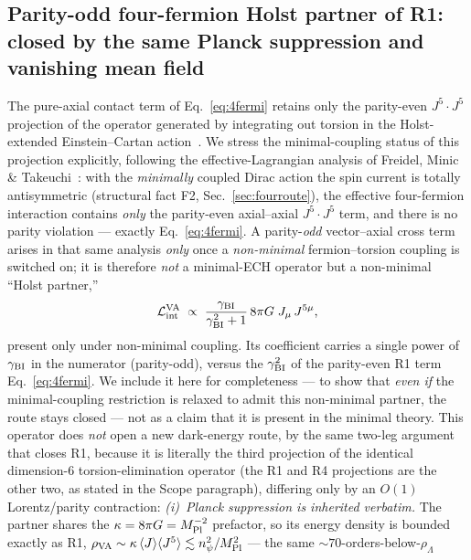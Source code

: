 \documentclass[aps,prd,twocolumn,superscriptaddress,showpacs,preprintnumbers,nofootinbib,longbibliography,floatfix]{revtex4-2}
\begin{document}
\subsection{Parity-odd four-fermion Holst partner of R1: closed by the same
Planck suppression and vanishing mean field}
\label{sec:r1_parityodd_partner}
The pure-axial contact term of Eq.~\eqref{eq:4fermi} retains only the
parity-even $J^5\!\cdot\!J^5$ projection of the operator generated by
integrating out torsion in the Holst-extended Einstein--Cartan
action~\cite{Freidel2005,Mercuri2009}. We stress the minimal-coupling
status of this projection explicitly, following the effective-Lagrangian
analysis of Freidel, Minic \& Takeuchi~\cite{Freidel2005}: with the
\emph{minimally} coupled Dirac action the spin current is totally
antisymmetric (structural fact F2, Sec.~\ref{sec:fourroute}), the effective
four-fermion interaction contains \emph{only} the parity-even axial--axial
$J^5\!\cdot\!J^5$ term, and there is no parity violation --- exactly
Eq.~\eqref{eq:4fermi}. A parity-\emph{odd} vector--axial cross term arises in
that same analysis \emph{only} once a \emph{non-minimal} fermion--torsion
coupling is switched on; it is therefore \emph{not} a minimal-ECH operator but
a non-minimal ``Holst partner,''
\begin{equation}\label{eq:4fermi_partner}
\mathcal{L}^{\rm VA}_{\rm int}
\;\propto\; \frac{\gamma_{\rm BI}}{\gamma_{\rm BI}^2+1}\,8\pi G\;
J_\mu\,J^{5\mu},
\end{equation}
present only under non-minimal coupling. Its
coefficient carries a single power of $\gamma_{\rm BI}$ in the numerator
(parity-odd), versus the $\gamma_{\rm BI}^2$ of the parity-even R1 term
Eq.~\eqref{eq:4fermi}. We include it here for completeness --- to show that
\emph{even if} the minimal-coupling restriction is relaxed to admit this
non-minimal partner, the route stays closed --- not as a claim that it is
present in the minimal theory. This operator does \emph{not} open a new dark-energy
route, by the same two-leg argument that closes R1, because it is literally the
third projection of the identical dimension-6 torsion-elimination operator
(the R1 and R4 projections are the other two, as stated in the Scope
paragraph), differing only by an $O(1)$ Lorentz/parity contraction:
\emph{(i)~Planck suppression is inherited verbatim.} The partner shares the
$\kappa = 8\pi G = M_{\rm Pl}^{-2}$ prefactor, so its energy density is bounded
exactly as R1, $\rho_{\rm VA}\sim\kappa\,\langle J\rangle\langle J^5\rangle
\lesssim n_\psi^2/M_{\rm Pl}^2$ --- the same ${\sim}70$-orders-below-$\rho_\Lambda$
\end{document}
